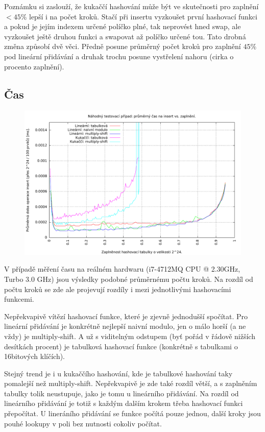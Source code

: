 \documentclass[12pt,a4paper]{report}
\begin{document}
Poznámku si zaslouží, že kukaččí hashování může být ve skutečnosti pro zaplnění $<45 \%$ lepší i na počet kroků. Stačí při insertu vyzkoušet první hashovací funkci a pokud je jejím indexem určené políčko plné, tak neprovést hned swap, ale vyzkoušet ještě druhou funkci a swapovat až políčko určené tou. Tato drobná změna způsobí dvě věci. Předně posune průměrný počet kroků pro zaplnění $45 \%$ pod lineární přidávání a druhak trochu posune vystřelení nahoru (cirka o procento zaplnění).

	\subsection{Čas}

	\begin{figure}[h]	
	\centering	
	\includegraphics[scale=0.6]{graph_rand_time}		
	\end{figure}

V případě měření času na reálném hardwaru (i7-4712MQ CPU @ 2.30GHz, Turbo 3.0 GHz) jsou výsledky podobné průměrnému počtu kroků. Na rozdíl od počtu kroků se zde ale projevují rozdíly i mezi jednotlivými hashovacími funkcemi. 

Nepřekvapivě vítězí hashovací funkce, které je zjevně jednodušší spočítat. Pro lineární přidávání je konkrétně nejlepší naivní modulo, jen o málo horší (a ne vždy) je multiply-shift. A už s viditelným odstupem (byť pořád v řádově nižších desítkách procent) je tabulková hashovací funkce (konkrétně s tabulkami o 16bitových klíčích).

Stejný trend je i u kukaččího hashování, kde je tabulkové hashování taky pomalejší než multiply-shift. Nepřekvapivě je zde také rozdíl větší, a s zaplněním tabulky tolik neustupuje, jako je tomu u lineárního přidávání. Na rozdíl od lineárního přidávání je totiž s každým dalším krokem třeba hashovací funkci přepočítat. U lineráního přidávání se funkce počítá pouze jednou, další kroky jsou pouhé lookupy v poli bez nutnosti cokoliv počítat. 
\end{document}
